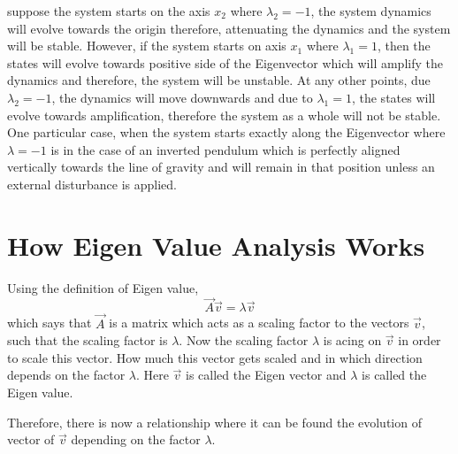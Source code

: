 suppose the system starts on the axis $x_2$ where $\lambda_{2} = -1$, the system dynamics will evolve towards the origin therefore, attenuating the dynamics and the system will be stable. However, if the system starts on axis $x_{1}$ where $\lambda_{1} = 1$, then the states will evolve towards positive side of the Eigenvector which will amplify the dynamics and therefore, the system will be unstable. At any other points, due $\lambda_{2} = -1$, the dynamics will move downwards and due to $\lambda_{1} = 1$, the states will evolve towards amplification, therefore the system as a whole will not be stable. One particular case, when the system starts exactly along the Eigenvector where $\lambda = -1$ is in the case of an inverted pendulum which is perfectly aligned vertically towards the line of gravity and will remain in that position unless an external disturbance is applied.

\section{How Eigen Value Analysis Works}

Using the definition of Eigen value,
\begin{equation}
	\vec{A}\vec{v} = \lambda \vec{v}
\end{equation}
which says that $\vec{A}$ is a matrix which acts as a scaling factor to the vectors $\vec{v}$, such that the scaling factor is $\lambda$. Now the scaling factor $\lambda$ is acing on $\vec{v}$ in order to scale this vector. How much this vector gets scaled and in which direction depends on the factor $\lambda$. Here $\vec{v}$ is called the Eigen vector and $\lambda$ is called the Eigen value. 

Therefore, there is now a relationship where it can be found the evolution of vector of $\vec{v}$ depending on the factor $\lambda$.
